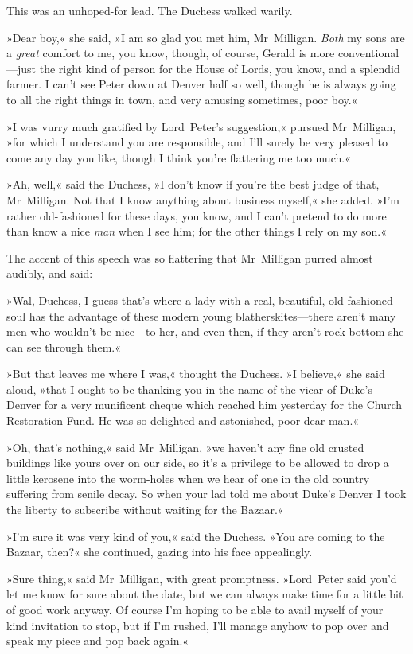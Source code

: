 This was an unhoped-for lead. The Duchess walked warily.

»Dear boy,« she said, »I am so glad you met him, Mr~Milligan. \textit{Both} my sons are a \textit{great} comfort to me, you know, though, of course, Gerald is more conventional—just the right kind of person for the House of Lords, you know, and a splendid farmer. I can't see Peter down at Denver half so well, though he is always going to all the right things in town, and very amusing sometimes, poor boy.«

»I was vurry much gratified by Lord~Peter's suggestion,« pursued Mr~Milligan, »for which I understand you are responsible, and I'll surely be very pleased to come any day you like, though I think you're flattering me too much.«

»Ah, well,« said the Duchess, »I don't know if you're the best judge of that, Mr~Milligan. Not that I know anything about business myself,« she added. »I'm rather old-fashioned for these days, you know, and I can't pretend to do more than know a nice \textit{man} when I see him; for the other things I rely on my son.«

The accent of this speech was so flattering that Mr~Milligan purred almost audibly, and said:

»Wal, Duchess, I guess that's where a lady with a real, beautiful, old-fashioned soul has the advantage of these modern young blatherskites—there aren't many men who wouldn't be nice—to her, and even then, if they aren't rock-bottom she can see through them.«

»But that leaves me where I was,« thought the Duchess. »I believe,« she said aloud, »that I ought to be thanking you in the name of the vicar of Duke's Denver for a very munificent cheque which reached him yesterday for the Church Restoration Fund. He was so delighted and astonished, poor dear man.«

»Oh, that's nothing,« said Mr~Milligan, »we haven't any fine old crusted buildings like yours over on our side, so it's a privilege to be allowed to drop a little kerosene into the worm-holes when we hear of one in the old country suffering from senile decay. So when your lad told me about Duke's Denver I took the liberty to subscribe without waiting for the Bazaar.«

»I'm sure it was very kind of you,« said the Duchess. »You are coming to the Bazaar, then?« she continued, gazing into his face appealingly.

»Sure thing,« said Mr~Milligan, with great promptness. »Lord~Peter said you'd let me know for sure about the date, but we can always make time for a little bit of good work anyway. Of course I'm hoping to be able to avail myself of your kind invitation to stop, but if I'm rushed, I'll manage anyhow to pop over and speak my piece and pop back again.«

